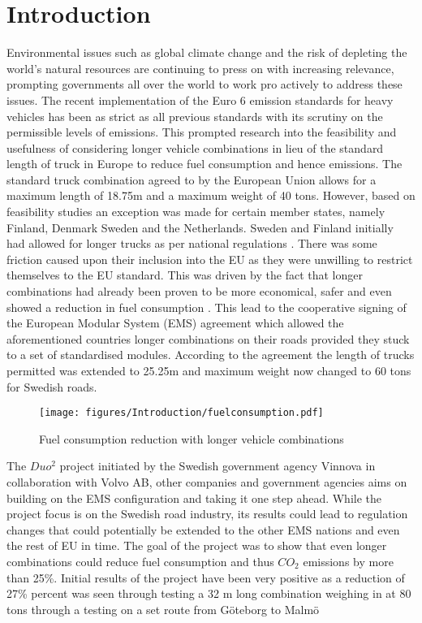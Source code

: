 \documentclass[MastersThesis.tex]{subfiles}
\begin{document}
\chapter{Introduction}
	Environmental issues such as global climate change and the risk of depleting the world's natural resources are continuing to press on with increasing relevance, prompting governments all over the world to work pro actively to address these issues. The recent implementation of the Euro 6 emission standards for heavy vehicles has been as strict as all previous standards with its scrutiny on the permissible levels of emissions. This prompted research into the feasibility and usefulness of considering longer vehicle combinations in lieu of the standard length of truck in Europe to reduce fuel consumption and hence emissions. The standard truck combination agreed to by the European Union allows for a maximum length of 18.75m and a maximum weight of 40 tons. However, based on feasibility studies an exception was made for certain member states, namely Finland, Denmark Sweden and the Netherlands. Sweden and Finland initially had allowed for longer trucks as per national regulations \cite{Davidsson11}. There was some friction caused upon their inclusion into the EU as they were unwilling to restrict themselves to the EU standard. This was driven by the fact that longer combinations had already been proven to be more economical, safer and even showed a reduction in fuel consumption \cite{SNRTRI08}. This lead to the cooperative signing of the European Modular System (EMS) agreement which allowed the aforementioned countries longer combinations on their roads provided they stuck to a set of standardised modules. According to the agreement the length of trucks permitted was extended to 25.25m and maximum weight now changed to 60 tons for Swedish roads.\cite{SNRTRI08}\\

	\begin{figure}[ht!]
		\begin{center}
			\texttt{[image: figures/Introduction/fuelconsumption.pdf]}
		\end{center}
		\caption{Fuel consumption reduction with longer vehicle combinations}
		\label{fig:fuelconsumptionred}
	\end{figure}

	The $Duo^2$ project initiated by the Swedish government agency Vinnova in collaboration with Volvo AB, other companies and government agencies aims on building on the EMS configuration and taking it one step ahead. While the project focus is on the Swedish road industry, its results could lead to regulation changes that could potentially be extended to the other EMS nations and even the rest of EU in time. The goal of the project was to show that even longer combinations could reduce fuel consumption and thus $CO_2$ emissions by more than 25\%. Initial results of the project have been very positive as a reduction of 27\% percent was seen through testing a 32 m long combination weighing in at 80 tons through a testing on a set route from G\"oteborg to Malm\"o \cite{Cider13}
\end{document}
